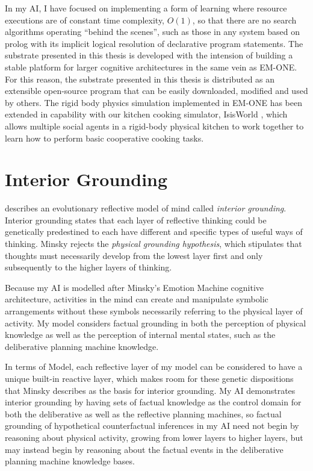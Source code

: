 In my AI, I have focused on implementing a form of learning where
resource executions are of constant time complexity, $O(1)$, so that
there are no search algorithms operating ``behind the scenes'', such
as those in any system based on prolog with its implicit logical
resolution of declarative program statements.  The substrate presented
in this thesis is developed with the intension of building a stable
platform for larger cognitive architectures in the same vein as
EM-ONE.  For this reason, the substrate presented in this thesis is
distributed as an extensible open-source program that can be easily
downloaded, modified and used by others.  The rigid body physics
simulation implemented in EM-ONE has been extended in capability with
our kitchen cooking simulator, IsisWorld \cite[]{smith:2010}, which
allows multiple social agents in a rigid-body physical kitchen to work
together to learn how to perform basic cooperative cooking tasks.

\section{Interior Grounding}

\cite{minsky:2005} describes an evolutionary reflective model of mind
called \emph{interior grounding}.  Interior grounding states that each
layer of reflective thinking could be genetically predestined to each
have different and specific types of useful ways of thinking.  Minsky
rejects the \emph{physical grounding hypothesis}, which stipulates
that thoughts must necessarily develop from the lowest layer first and
only subsequently to the higher layers of thinking.

Because my AI is modelled after Minsky's Emotion Machine cognitive
architecture, activities in the mind can create and manipulate
symbolic arrangements without these symbols necessarily referring to
the physical layer of activity.  My model considers factual grounding
in both the perception of physical knowledge as well as the perception
of internal mental states, such as the deliberative planning machine
knowledge.

In terms of Model, each reflective layer of my model can
be considered to have a unique built-in reactive layer, which makes
room for these genetic dispositions that Minsky describes as the basis
for interior grounding.  My AI demonstrates interior grounding by
having sets of factual knowledge as the control domain for both the
deliberative as well as the reflective planning machines, so factual
grounding of hypothetical counterfactual inferences in my AI need not
begin by reasoning about physical activity, growing from lower layers
to higher layers, but may instead begin by reasoning about the factual
events in the deliberative planning machine knowledge bases.

